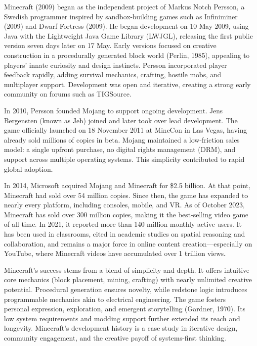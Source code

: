 \begin{historical}
Minecraft (2009) began as the independent project of Markus \QSOpen{}Notch\QSClose{} Persson, a Swedish programmer inspired by sandbox-building games such as Infiniminer (2009) and Dwarf Fortress (2009). He began development on 10 May 2009, using Java with the Lightweight Java Game Library (LWJGL), releasing the first public version seven days later on 17 May. Early versions focused on creative construction in a procedurally generated block world (Perlin, 1985), appealing to players' innate curiosity and design instincts. Persson incorporated player feedback rapidly, adding survival mechanics, crafting, hostile mobs, and multiplayer support. Development was open and iterative, creating a strong early community on forums such as TIGSource.

In 2010, Persson founded Mojang to support ongoing development. Jens Bergensten (known as Jeb) joined and later took over lead development. The game officially launched on 18 November 2011 at MineCon in Las Vegas, having already sold millions of copies in beta. Mojang maintained a low-friction sales model: a single upfront purchase, no digital rights management (DRM), and support across multiple operating systems. This simplicity contributed to rapid global adoption.

In 2014, Microsoft acquired Mojang and Minecraft for \$2.5 billion. At that point, Minecraft had sold over 54 million copies. Since then, the game has expanded to nearly every platform, including consoles, mobile, and VR. As of October 2023, Minecraft has sold over 300 million copies, making it the best-selling video game of all time. In 2021, it reported more than 140 million monthly active users. It has been used in classrooms, cited in academic studies on spatial reasoning and collaboration, and remains a major force in online content creation—especially on YouTube, where Minecraft videos have accumulated over 1 trillion views.

Minecraft’s success stems from a blend of simplicity and depth. It offers intuitive core mechanics (block placement, mining, crafting) with nearly unlimited creative potential. Procedural generation ensures novelty, while redstone logic introduces programmable mechanics akin to electrical engineering. The game fosters personal expression, exploration, and emergent storytelling (Gardner, 1970). Its low system requirements and modding support further extended its reach and longevity. Minecraft’s development history is a case study in iterative design, community engagement, and the creative payoff of systems-first thinking.
\end{historical}